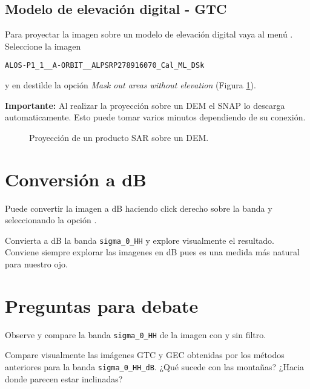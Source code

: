\subsection{Modelo de elevación digital - GTC}

Para proyectar la imagen sobre un modelo de elevación digital vaya al menú . Seleccione la imagen
\begin{center} \texttt{ALOS-P1\_1\_\_A-ORBIT\_\_ALPSRP278916070\_Cal\_ML\_DSk}
  \end{center}
  y en  destilde la opción \emph{Mask out areas without elevation} (Figura \ref{fig:gtc}).

{\bf Importante:} Al realizar la proyección sobre un DEM el SNAP lo descarga automaticamente. Esto puede tomar varios minutos dependiendo de su conexión.

\begin{figure}[h!]
    \centering
    \hspace{1cm}
    \caption{Proyección de un producto SAR sobre un DEM.}
    \label{fig:gtc}
\end{figure}

\section{Conversión a dB}

Puede convertir la imagen a dB haciendo click derecho sobre la banda y seleccionando la opción .

Convierta a dB la banda \texttt{sigma\_0\_HH} y explore visualmente el resultado. Conviene siempre explorar las imagenes en dB pues es una medida más natural para nuestro ojo.

\section{Preguntas para debate}

\begin{que}
    Observe y compare la banda \texttt{sigma\_0\_HH} de la imagen con y sin filtro.
\end{que}

\begin{que}
    Compare visualmente las imágenes GTC y GEC obtenidas por los métodos anteriores para la banda \texttt{sigma\_0\_HH\_dB}. ¿Qué sucede con las montañas? ¿Hacia donde parecen estar inclinadas?
\end{que}

